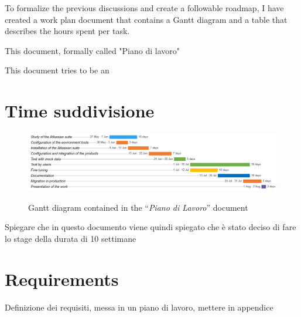 	To formalize the previous discussions and create a followable roadmap, I have created a work plan document that contains a Gantt diagram and a table that describes the hours spent per task.
	
	This document, formally called "Piano di lavoro"
	
	This document tries to be an
	
	\section{Time suddivisione}
	
		\begin{figure}[H]
			\centering
			\includegraphics[width=1.1\textwidth]{resources/work_plan_gantt}\\
			\caption{Gantt diagram contained in the ``\textit{Piano di Lavoro}'' document}
		\end{figure}

		Spiegare che in questo documento viene quindi spiegato che è stato deciso di fare lo stage della durata di 10 settimane

	\section{Requirements}
	
		Definizione dei requisiti, messa in un piano di lavoro, mettere in appendice
	
